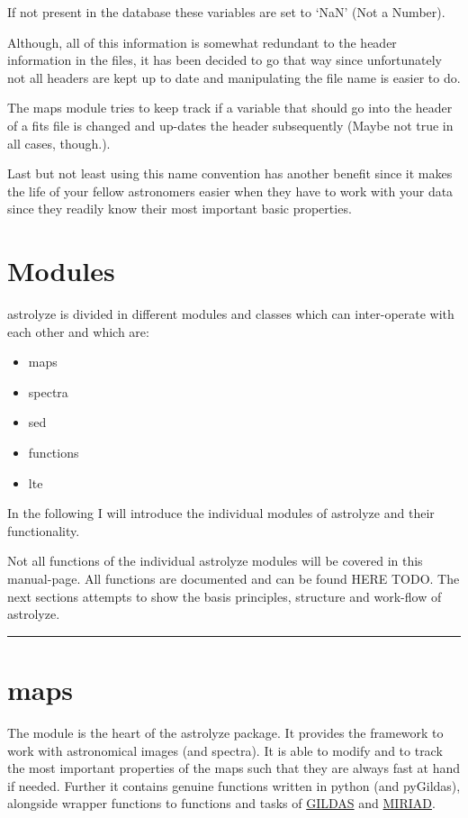 \documentclass[a4paper,10pt,english]{sphinxmanual}
\begin{document}
If not present in the database these variables are set to `NaN' (Not a Number).

Although, all of this information is somewhat redundant to the header
information in the files, it has been decided to go that way since
unfortunately not all headers are kept up to date and manipulating the file
name is easier to do.

The maps module tries to keep track if a variable that should go into the
header of a fits file is changed and up-dates the header subsequently (Maybe
not true in all cases, though.).

Last but not least using this name convention has another benefit since it
makes the life of your fellow astronomers easier when they have to work with
your data since they readily know their most important basic properties.


\chapter{Modules}
\label{manual:modules}
astrolyze is divided in different modules and classes which can inter-operate
with each other and which are:
\begin{itemize}
\item {} 
maps

\item {} 
spectra

\item {} 
sed

\item {} 
functions

\item {} 
lte

\end{itemize}

In the following I will introduce the individual modules of astrolyze and their
functionality.

Not all functions of the individual astrolyze modules will be covered in this
manual-page. All functions are documented and can be found HERE TODO.  The next
sections attempts to show the basis principles, structure and work-flow of
astrolyze.


\bigskip\hrule{}\bigskip



\chapter{maps}
\label{manual:maps}
The  module is the heart of the astrolyze package. It provides the
framework to work with astronomical images (and spectra). It is able to modify
and to track the most important properties of the maps such that they are always
fast at hand if needed. Further it contains genuine functions written in python
(and pyGildas), alongside wrapper functions to functions and tasks of {\hyperref[manual:gildas]{GILDAS}}
and {\hyperref[manual:miriad]{MIRIAD}}.
\end{document}
